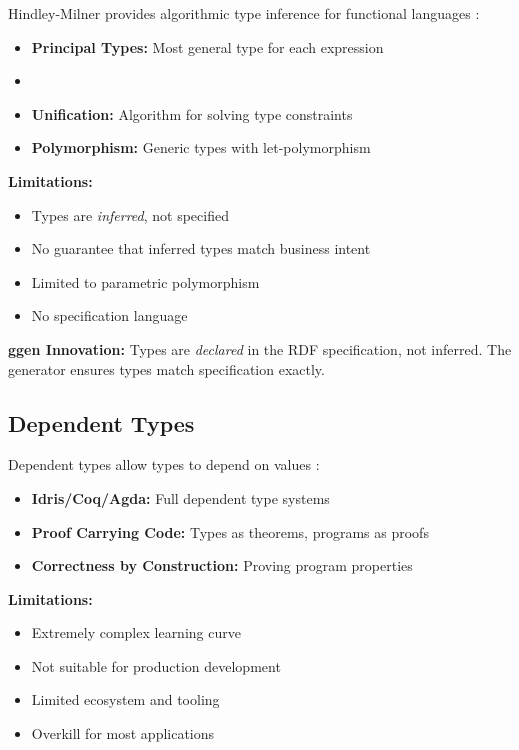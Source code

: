 Hindley-Milner provides algorithmic type inference for functional languages \cite{hindley1969, milner1978}:

\begin{itemize}
    \item \textbf{Principal Types:} Most general type for each expression
    \item \item \textbf{Unification:} Algorithm for solving type constraints
    \item \textbf{Polymorphism:} Generic types with let-polymorphism
\end{itemize}

\textbf{Limitations:}
\begin{itemize}
    \item Types are \textit{inferred}, not specified
    \item No guarantee that inferred types match business intent
    \item Limited to parametric polymorphism
    \item No specification language
\end{itemize}

\textbf{ggen Innovation:} Types are \textit{declared} in the RDF specification, not inferred. The generator ensures types match specification exactly.

\subsection{Dependent Types}

Dependent types allow types to depend on values \cite{pierce2002types}:

\begin{itemize}
    \item \textbf{Idris/Coq/Agda:} Full dependent type systems
    \item \textbf{Proof Carrying Code:} Types as theorems, programs as proofs
    \item \textbf{Correctness by Construction:} Proving program properties
\end{itemize}

\textbf{Limitations:}
\begin{itemize}
    \item Extremely complex learning curve
    \item Not suitable for production development
    \item Limited ecosystem and tooling
    \item Overkill for most applications
\end{itemize}

